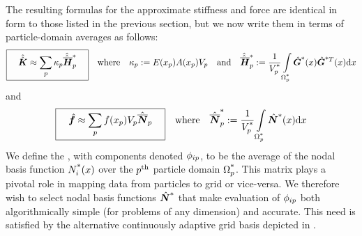 The resulting formulas for the approximate stiffness and force are identical in form to those listed in the previous section, but we now write them in terms of particle-domain averages as follows:
\begin{equation}
\boxed{\quad
  \hat{\hat{\bm{K}}}
\approx
  \sum\limits_p \kappa_p \hat{\hat{\bm{\overline{H}}}}_p^{\text{*}}
\quad}
\quad\text{where}\quad 
\kappa_p:= E(x_p)A(x_p)V_p
\quad\text{and}\quad
\hat{\hat{\bm{\overline{H}}}}_p^{\text{*}} := \frac{1}{V_p^{\text{*}}}\int\limits_{\Omega_p^{\text{*}}} \hat{\bm{G}}^{\text{*}}(x)\hat{\bm{G}}^{\text{*} T}(x) \mathrm{d} x
\label{eq:altLinearBarStiffnessIntegral}
\end{equation}
and
\begin{equation}
\boxed{\quad
  \hat{\bm{f}}
\approx
  \sum\limits_p f(x_p)V_p \hat{\bm{\overline{N}}}_p
\quad}
\quad\text{where}\quad 
\hat{\bm{\overline{N}}}_p^{\text{*}}:=\frac{1}{V_p^{\text{*}}}\int\limits_{\Omega_p^{\text{*}}} \hat{\bm{N}}^{\text{*}}(x) \mathrm{d} x
\label{eq:altLinearBarForceIntegral}
\end{equation}
%
We define the , with components denoted ${\phi_{ip}}$, to be the average of the \ith nodal basis function ${N}_i^{\text{*}}(x)$ over the $p^\text{th}$ particle domain $\Omega_p^{\text{*}}$.  This matrix plays a pivotal role in mapping data from particles to grid or vice-versa.  We therefore wish to select nodal basis functions $\hat{\bm{N}}^{\text{*}}$ that make evaluation of ${\phi_{ip}}$ both algorithmically simple (for problems of any dimension) and accurate.  This need is satisfied by the alternative continuously adaptive grid basis depicted in . 

